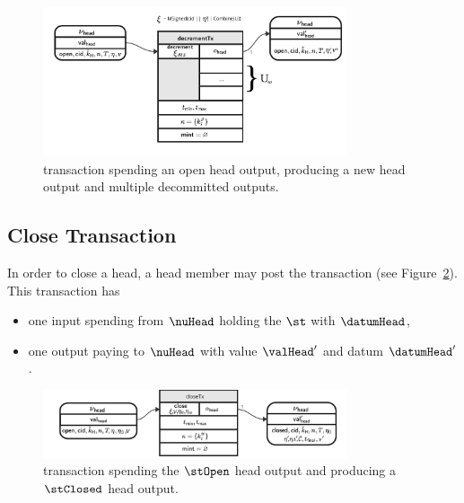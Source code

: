 \begin{figure}
	\centering
        \includegraphics[width=0.8\textwidth]{Hydra/Protocol/Figures/decrementTx.pdf}
	\caption{\mtxDecrement{} transaction spending an open head output,
		producing a new head output and multiple decommitted outputs.}\label{fig:decrementTx}
\end{figure}

\subsection{Close Transaction}\label{sec:close-tx}

In order to close a head, a head member may post the \mtxClose{} transaction
(see Figure~\ref{fig:closeTx}). This transaction has
\begin{itemize}
	\item one input spending from $\nuHead$ holding the $\st$ with $\datumHead$,
	\item one output paying to $\nuHead$ with value $\valHead'$ and
	      datum $\datumHead'$.
\end{itemize}

\begin{figure}
	\centering
        \includegraphics[width=0.8\textwidth]{Hydra/Protocol/Figures/closeTx.pdf}
	\caption{\mtxClose{} transaction spending the $\stOpen$ head output and producing a $\stClosed$ head output.}\label{fig:closeTx}
\end{figure}

